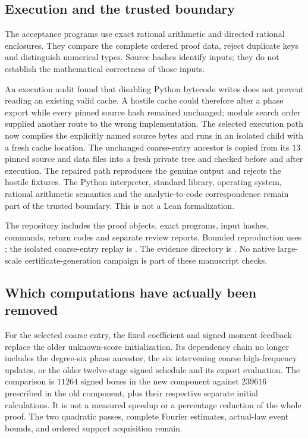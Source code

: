 \subsection{Execution and the trusted boundary}

The acceptance programs use exact rational arithmetic and directed
rational enclosures. They compare the complete ordered proof data, reject
duplicate keys and distinguish numerical types. Source hashes identify
inputs; they do not establish the mathematical correctness of those inputs.

An execution audit found that disabling Python bytecode writes does not
prevent reading an existing valid cache. A hostile cache could therefore
alter a phase export while every pinned source hash remained unchanged;
module search order supplied another route to the wrong implementation.
The selected execution path now compiles the explicitly named source bytes
and runs in an isolated child with a fresh cache location. The unchanged
coarse-entry ancestor is copied from its $13$ pinned source and data files into a
fresh private tree and checked before and after execution. The repaired
path reproduces the genuine output and rejects the hostile fixtures.
The Python interpreter, standard library, operating system, rational
arithmetic semantics and the analytic-to-code correspondence remain part
of the trusted boundary. This is not a Lean formalization.

The repository includes the proof objects, exact programs, input hashes,
commands, return codes and separate review reports. Bounded reproduction
uses ; the isolated
coarse-entry replay is
.
The evidence directory is .
No native large-scale certificate-generation campaign is part of these
manuscript checks.

\subsection{Which computations have actually been removed}

For the selected coarse entry, the fixed coefficient and signed moment
feedback replace the older unknown-score initialization. Its dependency
chain no longer includes the degree-six phase ancestor, the six intervening
coarse high-frequency updates, or the older twelve-stage signed schedule and its export evaluation.
The comparison is $11264$ signed boxes in the new component against
$239616$ prescribed in the old component, plus their respective separate
initial calculations. It is not a measured speedup or a percentage reduction
of the whole proof. The two quadratic passes, complete Fourier estimates,
actual-law event bounds, and ordered support acquisition remain.

